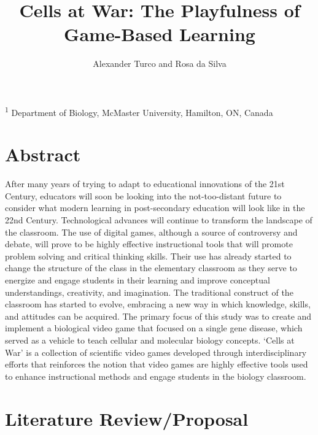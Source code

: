\documentclass[10pt]{article}
\title{\sc Cells at War: The Playfulness of Game-Based Learning}
\author{\sc Alexander Turco and Rosa da Silva}
\begin{document}

\onecolumn
                        \maketitle

\thispagestyle{empty}
\noindent \textsuperscript{1} Department of Biology, McMaster University, Hamilton, ON, Canada

\newpage
\tableofcontents
\newpage

\section{Abstract}

After many years of trying to adapt to educational innovations of the 21st Century, educators will soon be looking into the not-too-distant future to consider what modern learning in post-secondary education will look like in the 22nd Century. Technological advances will continue to transform the landscape of the classroom. The use of digital games, although a source of controversy and debate, will prove to be highly effective instructional tools that will promote problem solving and critical thinking skills. Their use has already started to change the structure of the class in the elementary classroom as they serve to energize and engage students in their learning and improve conceptual understandings, creativity, and imagination. The traditional construct of the classroom has started to evolve, embracing a new way in which knowledge, skills, and attitudes can be acquired. The primary focus of this study was to create and implement a biological video game that focused on a single gene disease, which served as a vehicle to teach cellular and molecular biology concepts. ‘Cells at War’ is a collection of scientific video games developed through interdisciplinary efforts that reinforces the notion that video games are highly effective tools used to enhance instructional methods and engage students in the biology classroom.

\newpage
       
\section{Literature Review/Proposal}
\end{document}
